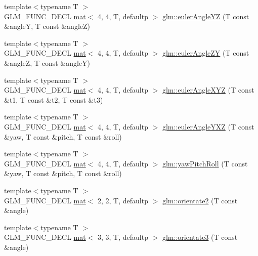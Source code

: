 \begin{DoxyCompactItemize}
\item 
{\footnotesize template$<$typename T $>$ }\\G\+L\+M\+\_\+\+F\+U\+N\+C\+\_\+\+D\+E\+CL \hyperlink{structglm_1_1mat}{mat}$<$ 4, 4, T, defaultp $>$ \hyperlink{group__gtx__euler__angles_ga220379e10ac8cca55e275f0c9018fed9}{glm\+::euler\+Angle\+YZ} (T const \&angleY, T const \&angleZ)
\item 
{\footnotesize template$<$typename T $>$ }\\G\+L\+M\+\_\+\+F\+U\+N\+C\+\_\+\+D\+E\+CL \hyperlink{structglm_1_1mat}{mat}$<$ 4, 4, T, defaultp $>$ \hyperlink{group__gtx__euler__angles_ga400b2bd5984999efab663f3a68e1d020}{glm\+::euler\+Angle\+ZY} (T const \&angleZ, T const \&angleY)
\item 
{\footnotesize template$<$typename T $>$ }\\G\+L\+M\+\_\+\+F\+U\+N\+C\+\_\+\+D\+E\+CL \hyperlink{structglm_1_1mat}{mat}$<$ 4, 4, T, defaultp $>$ \hyperlink{group__gtx__euler__angles_ga1975e0f0e9bed7f716dc9946da2ab645}{glm\+::euler\+Angle\+X\+YZ} (T const \&t1, T const \&t2, T const \&t3)
\item 
{\footnotesize template$<$typename T $>$ }\\G\+L\+M\+\_\+\+F\+U\+N\+C\+\_\+\+D\+E\+CL \hyperlink{structglm_1_1mat}{mat}$<$ 4, 4, T, defaultp $>$ \hyperlink{group__gtx__euler__angles_gab8ba99a9814f6d9edf417b6c6d5b0c10}{glm\+::euler\+Angle\+Y\+XZ} (T const \&yaw, T const \&pitch, T const \&roll)
\item 
{\footnotesize template$<$typename T $>$ }\\G\+L\+M\+\_\+\+F\+U\+N\+C\+\_\+\+D\+E\+CL \hyperlink{structglm_1_1mat}{mat}$<$ 4, 4, T, defaultp $>$ \hyperlink{group__gtx__euler__angles_gae6aa26ccb020d281b449619e419a609e}{glm\+::yaw\+Pitch\+Roll} (T const \&yaw, T const \&pitch, T const \&roll)
\item 
{\footnotesize template$<$typename T $>$ }\\G\+L\+M\+\_\+\+F\+U\+N\+C\+\_\+\+D\+E\+CL \hyperlink{structglm_1_1mat}{mat}$<$ 2, 2, T, defaultp $>$ \hyperlink{group__gtx__euler__angles_gae16738a9f1887cf4e4db6a124637608d}{glm\+::orientate2} (T const \&angle)
\item 
{\footnotesize template$<$typename T $>$ }\\G\+L\+M\+\_\+\+F\+U\+N\+C\+\_\+\+D\+E\+CL \hyperlink{structglm_1_1mat}{mat}$<$ 3, 3, T, defaultp $>$ \hyperlink{group__gtx__euler__angles_ga7ca98668a5786f19c7b38299ebbc9b4c}{glm\+::orientate3} (T const \&angle)
\item 

\end{DoxyCompactItemize}
